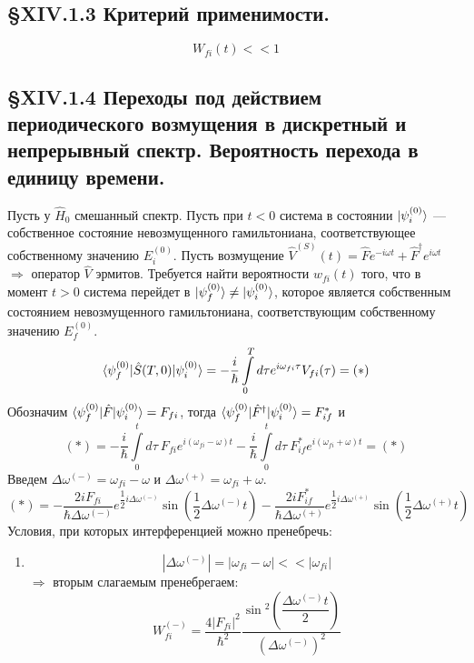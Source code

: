 \subsection{\S XIV.1.3 Критерий применимости.}
\[
W_{fi}(t) << 1
\]



\subsection{\S XIV.1.4 Переходы под действием периодического возмущения в дискретный и непрерывный спектр. Вероятность перехода в единицу времени.}
Пусть у $\hat{H}_0$ смешанный спектр. Пусть при $t < 0$ система в состоянии $| \psi_i^{(0)} \rangle$ --- собственное состояние невозмущенного гамильтониана, соответствующее собственному значению $E_i^{(0)}$. Пусть возмущение $\hat{V}^{(S)}(t) = \hat{F}e^{-i\omega t} + \hat{F}^\dagger e^{i\omega t}$ $\Longrightarrow$ оператор $\hat{V}$ эрмитов. Требуется найти вероятности $w_{fi}(t)$ того, что в момент $t>0$ система перейдет в $| \psi_f^{(0)} \rangle \neq | \psi_i^{(0)} \rangle$, которое является собственным состоянием невозмущенного гамильтониана, соответствующим собственному значению $E_f^{(0)}$.
\[
\langle \psi_f^{(0)} | \hat{S}(T, 0) | \psi_i^{(0)} \rangle = -\frac{i}{\hbar} \int\limits_0^T d\tau e^{i\omega_{fi}\tau} V_{fi}(\tau) = (*)
\]
Обозначим $\langle \psi_f^{(0)} | \hat{F} | \psi_i^{(0)} \rangle = F_{fi}$, тогда $\langle \psi_f^{(0)} | \hat{F}^\dagger | \psi_i^{(0)} \rangle = F_{if}^*$ и 
\[
(*) = -\dfrac{i}{\hbar}\int\limits_0^td\tau~F_{fi}e^{i(\omega_{fi} - \omega)t} -\dfrac{i}{\hbar}\int\limits_0^td\tau~F^*_{if}e^{i(\omega_{fi} + \omega)t} = (*)
\]
Введем $\Delta\omega^{(-)} = \omega_{fi} - \omega$ и $\Delta\omega^{(+)} = \omega_{fi} + \omega$.
\[
(*) = -\dfrac{2iF_{fi}}{\hbar\Delta\omega^{(-)}}e^{\dfrac{1}{2}i\Delta\omega^{(-)}}\sin{\left(\dfrac{1}{2}\Delta\omega^{(-)}t\right)}-\dfrac{2iF^*_{if}}{\hbar\Delta\omega^{(+)}}e^{\dfrac{1}{2}i\Delta\omega^{(+)}}\sin{\left(\dfrac{1}{2}\Delta\omega^{(+)}t\right)}
\]
Условия, при которых интерференцией можно пренебречь:
\begin{enumerate}
	\item \[
	\left|\Delta\omega^{(-)}\right| = |\omega_{fi} - \omega| << |\omega_{fi}|
	\]
	$\Longrightarrow$ вторым слагаемым пренебрегаем:
	\[
	W_{fi}^{(-)} = \dfrac{4|F_{fi}|^2}{\hbar^2}\dfrac{\sin{^2\left(\dfrac{\Delta\omega^{(-)}t}{2}\right)}}{(\Delta\omega^{(-)})^2}
	\]
\end{enumerate}
